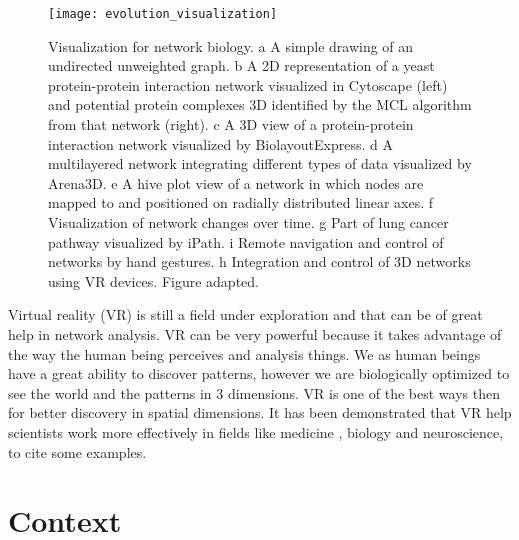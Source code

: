 \begin{figure}[h!]
    \newlength{\tempheight}
    \setlength{\tempheight}{15ex}
    \centering%
    \texttt{[image: evolution\_visualization]}
    \caption{Visualization for network biology. a A simple drawing of an undirected unweighted graph. b A 2D representation of a yeast protein-protein interaction network visualized in Cytoscape (left) and potential protein complexes 3D identified by the MCL algorithm from that network (right). c A 3D view of a protein-protein interaction network visualized by BiolayoutExpress. d A multilayered network integrating different types of data visualized by Arena3D. e A hive plot view of a network in which nodes are mapped to and positioned on radially distributed linear axes. f Visualization of network changes over time. g Part of lung cancer pathway visualized by iPath. i Remote navigation and control of networks by hand gestures. h Integration and control of 3D networks using VR devices. Figure adapted\cite{pavlopoulos_malliarakis_papanikolaou_theodosiou_enright_iliopoulos_2015}.}
    \label{fig:network_biology_evolution}
\end{figure}%

Virtual reality (VR) is still a field under exploration and that can be of great help in network analysis. VR can be very powerful because it takes advantage of the way the human being perceives and analysis things. We as human beings have a great ability to discover patterns, however we are biologically optimized to see the world and the patterns in 3 dimensions. VR is one of the best ways then for better discovery in spatial dimensions. It has been demonstrated that VR help scientists work more effectively in fields like medicine \cite{Laver11}\cite{xia_ip_samman_wong_gateno_wang_yeung_kot_tideman_2001}\cite{brain_damage_rehab}, biology\cite{10.1093/bioinformatics/bti581}\cite{thorley_lawson_duca_shapiro_2008} and neuroscience\cite{bohil_alicea_biocca_2011}\cite{minderer_harvey_donato_moser_2016}, to cite some examples.

\section{Context}

